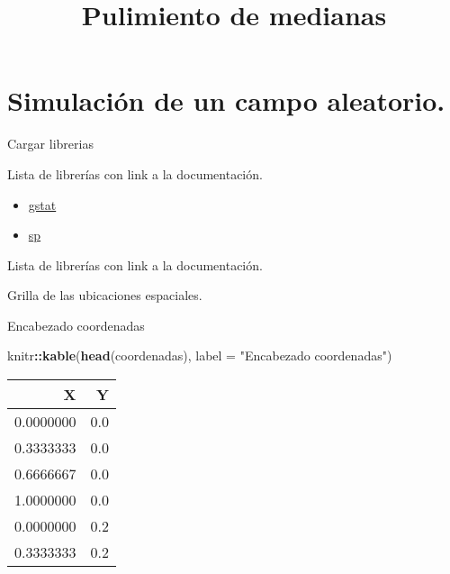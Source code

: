 \documentclass[ignorenonframetext,]{beamer}
\title{Pulimiento de medianas}
\author{}
\date{\vspace{-2.5em}}
\newenvironment{Shaded}{\begin{snugshade}}{\end{snugshade}}
\newcommand{\DataTypeTok}[1]{\textcolor[rgb]{0.13,0.29,0.53}{#1}}
\newcommand{\KeywordTok}[1]{\textcolor[rgb]{0.13,0.29,0.53}{\textbf{#1}}}
\newcommand{\NormalTok}[1]{#1}
\newcommand{\OperatorTok}[1]{\textcolor[rgb]{0.81,0.36,0.00}{\textbf{#1}}}
\newcommand{\StringTok}[1]{\textcolor[rgb]{0.31,0.60,0.02}{#1}}
\providecommand{\tightlist}{%
  \setlength{\itemsep}{0pt}\setlength{\parskip}{0pt}}
\begin{document}
\frame{\titlepage}

\hypertarget{simulaciuxf3n-de-un-campo-aleatorio.}{%
\section{Simulación de un campo
aleatorio.}\label{simulaciuxf3n-de-un-campo-aleatorio.}}

\begin{frame}{Cargar librerias}
\protect\hypertarget{cargar-librerias}{}

Lista de librerías con link a la documentación.

\begin{itemize}
\tightlist
\item
  \href{https://cran.r-project.org/web/packages/gstat/gstat.pdf}{gstat}
\item
  \href{https://cran.r-project.org/web/packages/sp/sp.pdf}{sp}
\end{itemize}

Lista de librerías con link a la documentación.

\end{frame}

\begin{frame}[fragile]{Grilla de las ubicaciones espaciales.}
\protect\hypertarget{grilla-de-las-ubicaciones-espaciales.}{}

Encabezado coordenadas

\begin{Shaded}
\begin{Highlighting}[]
\NormalTok{knitr}\OperatorTok{::}\KeywordTok{kable}\NormalTok{(}\KeywordTok{head}\NormalTok{(coordenadas), }\DataTypeTok{label =} \StringTok{"Encabezado coordenadas"}\NormalTok{)}
\end{Highlighting}
\end{Shaded}

\begin{longtable}[]{@{}rr@{}}
\toprule
X & Y\tabularnewline
\midrule
\endhead
0.0000000 & 0.0\tabularnewline
0.3333333 & 0.0\tabularnewline
0.6666667 & 0.0\tabularnewline
1.0000000 & 0.0\tabularnewline
0.0000000 & 0.2\tabularnewline
0.3333333 & 0.2\tabularnewline
\bottomrule
\end{longtable}

\end{frame}
\end{document}
